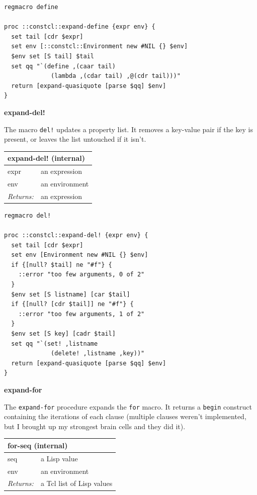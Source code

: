 \documentclass[twoside,9pt]{report}
\begin{document}
\noindent\makebox[\linewidth]{\rule{\linewidth}{0.4pt}}
\begin{lstlisting}
regmacro define
 
proc ::constcl::expand-define {expr env} {
  set tail [cdr $expr]
  set env [::constcl::Environment new #NIL {} $env]
  $env set [S tail] $tail
  set qq "`(define ,(caar tail)
             (lambda ,(cdar tail) ,@(cdr tail)))"
  return [expand-quasiquote [parse $qq] $env]
}
\end{lstlisting}
\noindent\makebox[\linewidth]{\rule{\linewidth}{0.4pt}}

\textbf{expand-del!}


The macro \texttt{del!} updates a property list. It removes a key-value pair if the key is present, or leaves the list untouched if it isn't.

\begin{tabular}{ |l l| }
\hline
\multicolumn{2}{|l|}{expand-del! (internal)} \\
\hline
expr & an expression \\
env & an environment \\
\textit{Returns:} & an expression \\
\hline
\end{tabular}

\noindent\makebox[\linewidth]{\rule{\linewidth}{0.4pt}}
\begin{lstlisting}
regmacro del!
 
proc ::constcl::expand-del! {expr env} {
  set tail [cdr $expr]
  set env [Environment new #NIL {} $env]
  if {[null? $tail] ne "#f"} {
    ::error "too few arguments, 0 of 2"
  }
  $env set [S listname] [car $tail]
  if {[null? [cdr $tail]] ne "#f"} {
    ::error "too few arguments, 1 of 2"
  }
  $env set [S key] [cadr $tail]
  set qq "`(set! ,listname
             (delete! ,listname ,key))"
  return [expand-quasiquote [parse $qq] $env]
}
\end{lstlisting}
\noindent\makebox[\linewidth]{\rule{\linewidth}{0.4pt}}

\textbf{expand-for}


The \texttt{expand-for} procedure expands the \texttt{for} macro. It returns a \texttt{begin} construct containing the iterations of each clause (multiple clauses weren't implemented, but I brought up my strongest brain cells and they did it).

\begin{tabular}{ |l l| }
\hline
\multicolumn{2}{|l|}{for-seq (internal)} \\
\hline
seq & a Lisp value \\
env & an environment \\
\textit{Returns:} & a Tcl list of Lisp values \\
\hline
\end{tabular}
\end{document}
